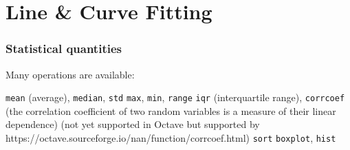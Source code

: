 \documentclass[11pt]{beamer}
\begin{document}
\section{Line \& Curve Fitting}

\begin{frame}[fragile]
	\frametitle{Statistical quantities}
	
	\begin{enumerate}
		\myitem  Many operations are available:
		\begin{enumerate}
			\mysubitem  \texttt{mean} (average), \texttt{median}, \texttt{std}
			\mysubitem  \texttt{max}, \texttt{min}, \texttt{range}
			\mysubitem  \texttt{iqr} (interquartile range), \texttt{corrcoef} (the correlation coefficient of two random variables is a measure of their linear dependence) (not yet supported in Octave but supported by https://octave.sourceforge.io/nan/function/corrcoef.html)
			\mysubitem  \texttt{sort}
			\mysubitem  \texttt{boxplot}, \texttt{hist}
		\end{enumerate}
	\end{enumerate}
\end{frame}
\end{document}
